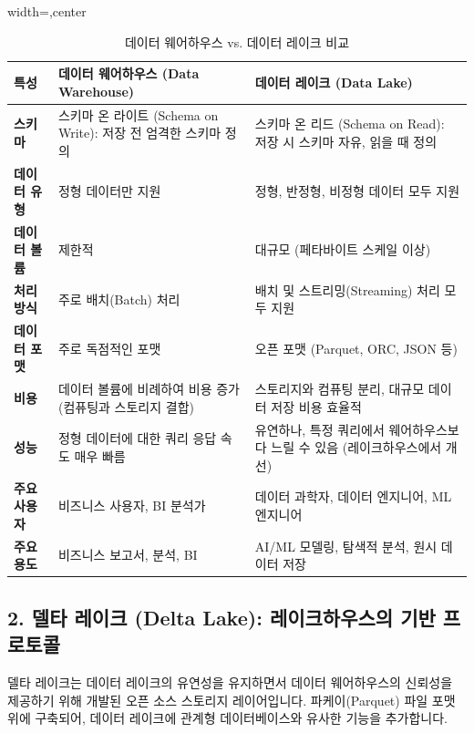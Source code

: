 \documentclass[11pt,a4paper]{article}
\theoremstyle{definition}
\begin{document}
\begin{table}[htbp]
\centering
\caption{데이터 웨어하우스 vs. 데이터 레이크 비교}
\label{tab:warehouse_vs_lake}
\begin{adjustbox}{width=\textwidth,center}
\begin{tabular}{p{3cm} p{6cm} p{6cm}}
\toprule
\textbf{특성} & \textbf{데이터 웨어하우스 (Data Warehouse)} & \textbf{데이터 레이크 (Data Lake)} \\
\midrule
\textbf{스키마} & 스키마 온 라이트 (Schema on Write): 저장 전 엄격한 스키마 정의 & 스키마 온 리드 (Schema on Read): 저장 시 스키마 자유, 읽을 때 정의 \\
\textbf{데이터 유형} & 정형 데이터만 지원 & 정형, 반정형, 비정형 데이터 모두 지원 \\
\textbf{데이터 볼륨} & 제한적 & 대규모 (페타바이트 스케일 이상) \\
\textbf{처리 방식} & 주로 배치(Batch) 처리 & 배치 및 스트리밍(Streaming) 처리 모두 지원 \\
\textbf{데이터 포맷} & 주로 독점적인 포맷 & 오픈 포맷 (Parquet, ORC, JSON 등) \\
\textbf{비용} & 데이터 볼륨에 비례하여 비용 증가 (컴퓨팅과 스토리지 결합) & 스토리지와 컴퓨팅 분리, 대규모 데이터 저장 비용 효율적 \\
\textbf{성능} & 정형 데이터에 대한 쿼리 응답 속도 매우 빠름 & 유연하나, 특정 쿼리에서 웨어하우스보다 느릴 수 있음 (레이크하우스에서 개선) \\
\textbf{주요 사용자} & 비즈니스 사용자, BI 분석가 & 데이터 과학자, 데이터 엔지니어, ML 엔지니어 \\
\textbf{주요 용도} & 비즈니스 보고서, 분석, BI & AI/ML 모델링, 탐색적 분석, 원시 데이터 저장 \\
\bottomrule
\end{tabular}
\end{adjustbox}
\end{table}

\subsection*{2. 델타 레이크 (Delta Lake): 레이크하우스의 기반 프로토콜}

델타 레이크는 데이터 레이크의 유연성을 유지하면서 데이터 웨어하우스의 신뢰성을 제공하기 위해 개발된 오픈 소스 스토리지 레이어입니다. 파케이(Parquet) 파일 포맷 위에 구축되어, 데이터 레이크에 관계형 데이터베이스와 유사한 기능을 추가합니다.
\end{document}
